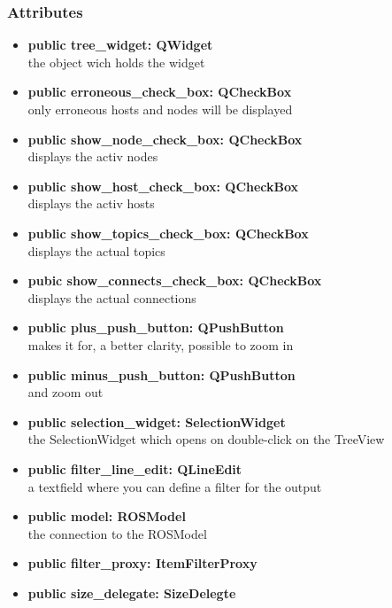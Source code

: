 \subsubsection{Attributes}
\begin{itemize}
  \item \textbf{public tree\_widget: QWidget}\\
  the object wich holds the widget
  \item \textbf{public erroneous\_check\_box: QCheckBox}\\
  only erroneous hosts and nodes will be displayed
  \item \textbf{public show\_node\_check\_box: QCheckBox}\\
  displays the activ nodes
  \item \textbf{public show\_host\_check\_box: QCheckBox}\\
  displays the activ hosts
  \item \textbf{public show\_topics\_check\_box: QCheckBox}\\
  displays the actual topics
  \item \textbf{pubic show\_connects\_check\_box: QCheckBox}\\
  displays the actual connections
  \item \textbf{public plus\_push\_button: QPushButton}\\
  makes it for, a better clarity, possible to zoom in  
  \item \textbf{public minus\_push\_button: QPushButton}\\
  and zoom out
  \item \textbf{public selection\_widget: SelectionWidget}\\
  the SelectionWidget which opens on double-click on the TreeView
  \item \textbf{public filter\_line\_edit: QLineEdit}\\
  a textfield where you can define a filter for the output
  \item \textbf{public model: ROSModel}\\
  the connection to the ROSModel
  \item \textbf{public filter\_proxy: ItemFilterProxy}\\
  
  \item \textbf{public size\_delegate: SizeDelegte}\\
  
\end{itemize}
